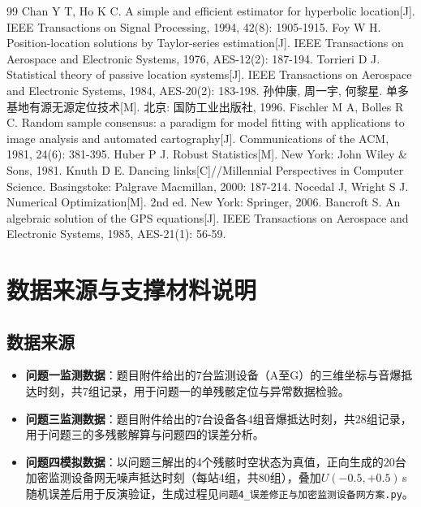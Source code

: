 \documentclass[draft,12pt,a4paper]{ctexart}
\theoremstyle{definition}
\begin{document}
\begin{thebibliography}{99}
   Chan Y T, Ho K C. A simple and efficient estimator for hyperbolic location[J]. IEEE Transactions on Signal Processing, 1994, 42(8): 1905-1915.
   Foy W H. Position-location solutions by Taylor-series estimation[J]. IEEE Transactions on Aerospace and Electronic Systems, 1976, AES-12(2): 187-194.
   Torrieri D J. Statistical theory of passive location systems[J]. IEEE Transactions on Aerospace and Electronic Systems, 1984, AES-20(2): 183-198.
   孙仲康, 周一宇, 何黎星. 单多基地有源无源定位技术[M]. 北京: 国防工业出版社, 1996.
   Fischler M A, Bolles R C. Random sample consensus: a paradigm for model fitting with applications to image analysis and automated cartography[J]. Communications of the ACM, 1981, 24(6): 381-395.
   Huber P J. Robust Statistics[M]. New York: John Wiley \& Sons, 1981.
  Knuth D E. Dancing links[C]//Millennial Perspectives in Computer Science. Basingstoke: Palgrave Macmillan, 2000: 187-214.
Nocedal J, Wright S J. Numerical Optimization[M]. 2nd ed. New York: Springer, 2006.
Bancroft S. An algebraic solution of the GPS equations[J]. IEEE Transactions on Aerospace and Electronic Systems, 1985, AES-21(1): 56-59.
\end{thebibliography}

\newpage
\appendix
{}
\renewcommand{\figurename}{附图}
\renewcommand{\tablename}{附表}
\setcounter{figure}{0}
\setcounter{table}{0}
\section{数据来源与支撑材料说明}\label{app:data}
\subsection{数据来源}
\begin{itemize}[itemsep=1pt]
  \item \textbf{问题一监测数据}：题目附件给出的7台监测设备（A至G）的三维坐标与音爆抵达时刻，共7组记录，用于问题一的单残骸定位与异常数据检验。
  \item \textbf{问题三监测数据}：题目附件给出的7台设备各4组音爆抵达时刻，共28组记录，用于问题三的多残骸解算与问题四的误差分析。
  \item \textbf{问题四模拟数据}：以问题三解出的4个残骸时空状态为真值，正向生成的20台加密监测设备网无噪声抵达时刻（每站4组，共80组），叠加$U(-0.5,+0.5)$\,s随机误差后用于反演验证，生成过程见\texttt{问题4\_误差修正与加密监测设备网方案.py}。
\end{itemize}
\end{document}
